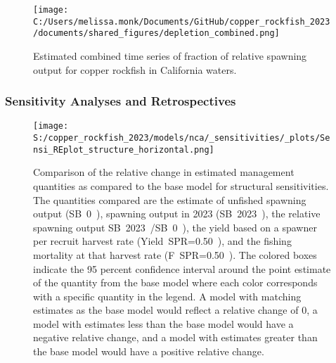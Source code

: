 \documentclass[11pt,
  letterpaper,
]{article}
\begin{document}
\clearpage

\begin{figure}
{\centering
\texttt{[image: C:/Users/melissa.monk/Documents/GitHub/copper\_rockfish\_2023/documents/shared\_figures/depletion\_combined.png]}
}
\caption{Estimated combined time series of fraction of relative spawning output for copper rockfish in California waters.\label{fig:depl-all}}
\end{figure}

\clearpage

\subsubsection{Sensitivity Analyses and Retrospectives}\label{sensitivity-analyses-and-retrospectives}

\begin{figure}
{\centering
\texttt{[image: S:/copper\_rockfish\_2023/models/nca/\_sensitivities/\_plots/Sensi\_REplot\_structure\_horizontal.png]}
}
\caption{Comparison of the relative change in estimated management quantities as compared to the 
base model for structural sensitivities. The quantities compared are the estimate of unfished 
spawning output (SB~0~), spawning output in 2023 (SB~2023~), the relative spawning output 
SB~2023~/SB~0~), the yield based on a spawner per recruit harvest rate (Yield~SPR=0.50~),
and the fishing mortality at that harvest rate (F~SPR=0.50~). The colored boxes indicate the 95 percent confidence interval around the point estimate of the quantity from the base model where each color corresponds with a specific quantity in the legend. A model with matching estimates as the base model would reflect a relative change of 0, a model with estimates less than the base model would have a negative relative change, and a model with estimates greater than the base model would have a positive relative change.\label{fig:sens-structure}}
\end{figure}

\newpage
\end{document}

